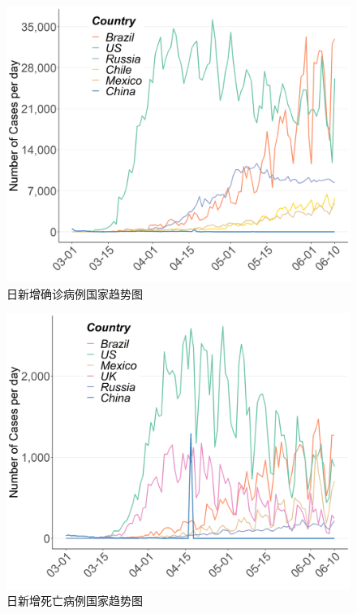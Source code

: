 \documentclass[
]{article}
\begin{document}
\vspace{-5mm}
\begin{figure}[H]
\centering
{}
\caption{日新增确诊病例国家趋势图}
\includegraphics[]{./input/covid2.png}
\end{figure}

\begin{figure}[H]
\centering
{}
\caption{日新增死亡病例国家趋势图}
\includegraphics[]{./input/covid3.png}
\end{figure}

\vspace{-7mm}
\end{document}
